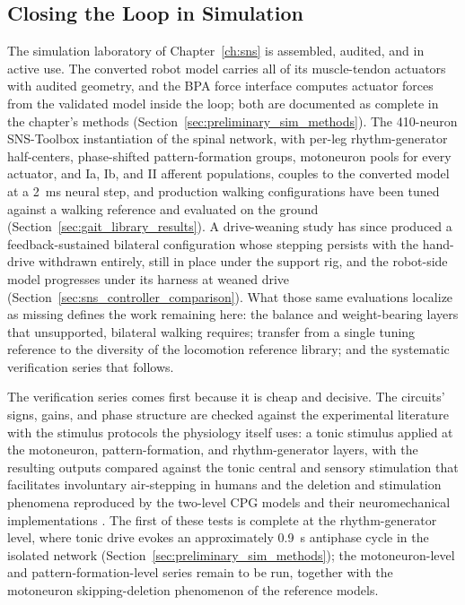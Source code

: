 \subsection{Closing the Loop in Simulation}\label{sec:fw_pipeline}\label{sec:fw_cpg}

The simulation laboratory of Chapter~\ref{ch:sns} is assembled, audited, and in active use. The converted robot model carries all of its muscle-tendon actuators with audited geometry, and the BPA force interface computes actuator forces from the validated model inside the loop; both are documented as complete in the chapter's methods (Section~\ref{sec:preliminary_sim_methods}). The 410-neuron SNS-Toolbox instantiation of the spinal network, with per-leg rhythm-generator half-centers, phase-shifted pattern-formation groups, motoneuron pools for every actuator, and Ia, Ib, and II afferent populations, couples to the converted model at a \qty{2}{\milli\second} neural step, and production walking configurations have been tuned against a walking reference and evaluated on the ground (Section~\ref{sec:gait_library_results}). A drive-weaning study has since produced a feedback-sustained bilateral configuration whose stepping persists with the hand-drive withdrawn entirely, still in place under the support rig, and the robot-side model progresses under its harness at weaned drive (Section~\ref{sec:sns_controller_comparison}). What those same evaluations localize as missing defines the work remaining here: the balance and weight-bearing layers that unsupported, bilateral walking requires; transfer from a single tuning reference to the diversity of the locomotion reference library; and the systematic verification series that follows.

The verification series comes first because it is cheap and decisive. The circuits' signs, gains, and phase structure are checked against the experimental literature with the stimulus protocols the physiology itself uses: a tonic stimulus applied at the motoneuron, pattern-formation, and rhythm-generator layers, with the resulting outputs compared against the tonic central and sensory stimulation that facilitates involuntary air-stepping in humans \citep{selionov_tonic_2009} and the deletion and stimulation phenomena reproduced by the two-level CPG models and their neuromechanical implementations \citep{rybak_modelling_2006, markin_afferent_2010, shevtsova_modeling_2016}. The first of these tests is complete at the rhythm-generator level, where tonic drive evokes an approximately \qty{0.9}{\second} antiphase cycle in the isolated network (Section~\ref{sec:preliminary_sim_methods}); the motoneuron-level and pattern-formation-level series remain to be run, together with the motoneuron skipping-deletion phenomenon of the reference models.

